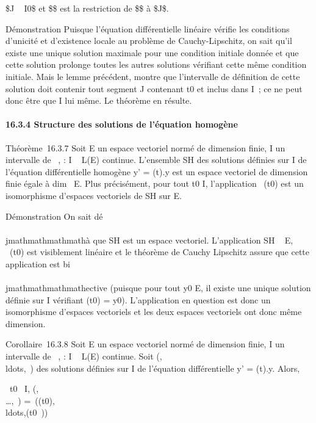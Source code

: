 \text\$J \subset~ I0\$ et \$\psi\$ est la restriction
de \$\phi\$ à \$J\$.

Démonstration Puisque l'équation différentielle linéaire vérifie les
conditions d'unicité et d'existence locale au problème de
Cauchy-Lipschitz, on sait qu'il existe une unique solution maximale pour
une condition initiale donnée et que cette solution prolonge toutes les
autres solutions vérifiant cette même condition initiale. Mais le lemme
précédent, montre que l'intervalle de définition de cette solution doit
contenir tout segment J contenant t0 et inclus dans I~; ce ne
peut donc être que I lui même. Le théorème en résulte.

\paragraph{16.3.4 Structure des solutions de l'équation homogène}

Théorème~16.3.7 Soit E un espace vectoriel normé de dimension finie, I
un intervalle de ~, \ell : I \rightarrow~ L(E) continue. L'ensemble SH des
solutions définies sur I de l'équation différentielle homogène y' =
\ell(t).y est un espace vectoriel de dimension finie égale à
dim~ E. Plus précisément, pour tout
t0 \in I, l'application
\phi\mapsto~\phi(t0) est un isomorphisme
d'espaces vectoriels de SH sur E.

Démonstration On sait dé\\\\jmathmathmathmathà que SH est un espace vectoriel.
L'application SH \rightarrow~ E,
\phi\mapsto~\phi(t0) est visiblement linéaire et
le théorème de Cauchy Lipschitz assure que cette application est
bi\\\\jmathmathmathmathective (puisque pour tout y0 \in E, il existe une unique
solution définie sur I vérifiant \phi(t0) = y0).
L'application en question est donc un isomorphisme d'espaces vectoriels
et les deux espaces vectoriels ont donc même dimension.

Corollaire~16.3.8 Soit E un espace vectoriel normé de dimension finie, I
un intervalle de ~, \ell : I \rightarrow~ L(E) continue. Soit
(,\\ldots,\phik~)
des solutions définies sur I de l'équation différentielle y' = \ell(t).y.
Alors,

\forall~t0~ \in I,
\mathrmrg(,\\\ldots,\phik~)
=\
\mathrmrg((t0),\\ldots,\phik(t0~))

